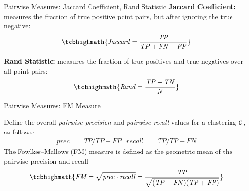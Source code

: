 \begin{frame}{Pairwise Measures: Jaccard Coeff\/{i}cient, Rand Statistic}
\small
{\bf Jaccard Coeff\/{i}cient:} measures the fraction of true positive point pairs,
but after ignoring the true negative:
\begin{align*}
\tcbhighmath{
\mathit{Jaccard} = \frac{\mathit{TP}}{\mathit{TP} + \mathit{FN} + \mathit{FP}}
}
\end{align*}

\medskip
{\bf Rand Statistic:} 
measures the fraction of true positives and true negatives over
all point pairs:
\begin{align*}
\tcbhighmath{
\mathit{Rand} = \frac{\mathit{TP} + \mathit{TN}}{N}
}
\end{align*}
\end{frame}

\begin{frame}{Pairwise Measures: FM Measure}

Def\/{i}ne the overall
{\em pairwise
precision} and
{\em pairwise recall} values for a clustering ${\mathcal C}$, as follows:
\begin{align*}
  \mathit{prec} & = \mathit{TP}/\mathit{TP}+\mathit{FP} &
  \mathit{recall} & = \mathit{TP}/\mathit{TP}+\mathit{FN}
\end{align*}
The Fowlkes--Mallows (FM) measure is def\/{i}ned as the
geometric mean of the pairwise precision and recall
\begin{align*}
\tcbhighmath{
\mathit{FM} = \sqrt{\mathit{prec}\cdot \mathit{recall}} = \frac{\mathit{TP}}{\sqrt{ (\mathit{TP}+\mathit{FN})(\mathit{TP}+\mathit{FP}) }}
}
\end{align*}
\end{frame}


